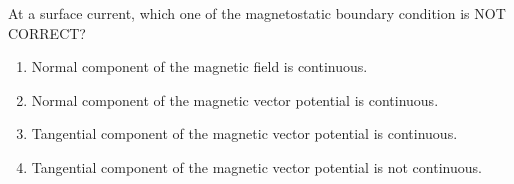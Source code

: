 \item At a surface current, which one of the magnetostatic boundary condition is NOT CORRECT?
\hfill{}
\begin{enumerate}
\item Normal component of the magnetic field is continuous.
\item Normal component of the magnetic vector potential is continuous.
\item Tangential component of the magnetic vector potential is continuous.
\item Tangential component of the magnetic vector potential is not continuous.
\end{enumerate}


